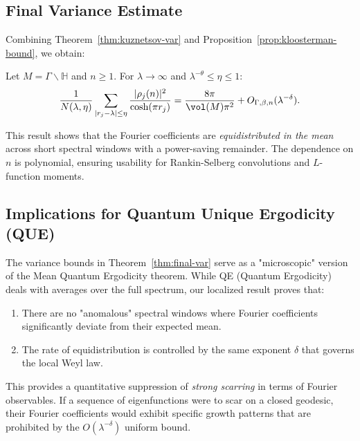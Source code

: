 \subsection{Final Variance Estimate}

Combining Theorem~\ref{thm:kuznetsov-var} and Proposition~\ref{prop:kloosterman-bound}, we obtain:

\begin{theorem}\label{thm:final-var}
Let $M = \Gamma \backslash \mathbb{H}$ and $n \ge 1$. For $\lambda \to \infty$ and $\lambda^{-\theta} \le \eta \le 1$:
\begin{equation}\label{eq:variance-final-bound}
\frac{1}{N(\lambda, \eta)} \sum_{|r_j - \lambda| \le \eta} \frac{|\rho_j(n)|^2}{\cosh(\pi r_j)} = \frac{8\pi}{\vol(M)\pi^2} + O_{\Gamma, \beta, n}(\lambda^{-\delta}).
\end{equation}
\end{theorem}

This result shows that the Fourier coefficients are \emph{equidistributed in the mean} across short spectral windows with a power-saving remainder. The dependence on $n$ is polynomial, ensuring usability for Rankin-Selberg convolutions and $L$-function moments.


\subsection{Implications for Quantum Unique Ergodicity (QUE)}

The variance bounds in Theorem~\ref{thm:final-var} serve as a "microscopic" version of the Mean Quantum Ergodicity theorem. While QE (Quantum Ergodicity) deals with averages over the full spectrum, our localized result proves that:
\begin{enumerate}
    \item There are no "anomalous" spectral windows where Fourier coefficients significantly deviate from their expected mean.
    \item The rate of equidistribution is controlled by the same exponent $\delta$ that governs the local Weyl law.
\end{enumerate}

This provides a quantitative suppression of \emph{strong scarring} in terms of Fourier observables. If a sequence of eigenfunctions were to scar on a closed geodesic, their Fourier coefficients would exhibit specific growth patterns that are prohibited by the $O(\lambda^{-\delta})$ uniform bound.

